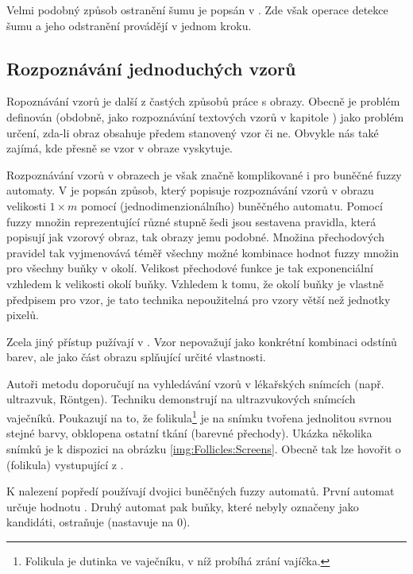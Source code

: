 \documentclass[a4paper,10pt]{article}
\begin{document}
Velmi podobný způsob ostranění šumu je popsán v \cite{SahUguSah-SalPepNoiFilFuzCelAut}. Zde však operace detekce šumu a jeho odstranění provádějí v jednom kroku.

\subsection{Rozpoznávání jednoduchých vzorů}

Ropoznávání vzorů je další z častých způsobů práce s obrazy. Obecně je problém definován (obdobně, jako rozpoznávání textových vzorů v kapitole ) jako problém určení, zda-li obraz obsahuje předem stanovený vzor či ne. Obvykle nás také zajímá, kde přesně se vzor v obraze vyskytuje.

Rozpoznávání vzorů v obrazech je však značně komplikované i pro buněčné fuzzy automaty. V \cite{MajCha-FuzCelAutModPatClas} je popsán způsob, který popisuje rozpoznávání vzorů v obrazu velikosti $1 \times m$ pomocí (jednodimenzionálního) buněčného automatu. Pomocí fuzzy množin reprezentující různé stupně šedi jsou sestavena pravidla, která popisují jak vzorový obraz, tak obrazy jemu podobné. Množina přechodových pravidel tak vyjmenovává téměř všechny možné kombinace hodnot fuzzy množin pro všechny buňky v okolí. Velikost přechodové funkce je tak exponenciální vzhledem k velikosti okolí buňky. Vzhledem k tomu, že okolí buňky je vlastně předpisem pro vzor, je tato technika nepoužitelná pro vzory větší než jednotky pixelů.

Zcela jiný přístup pužívají v \cite{WanJiaZhoDu-ImProcBasFuzCelAuMod}. Vzor nepovažují jako konkrétní kombinaci odstínů barev, ale jako část obrazu splňující určité vlastnosti.

Autoři metodu doporučují na vyhledávání vzorů v lékařských snímcích (např. ultrazvuk, Röntgen). Techniku demonstrují na ultrazvukových snímcích vaječníků. Poukazují na to, že folikula\footnote{Folikula je dutinka ve vaječníku, v níž probíhá zrání vajíčka. } je na snímku tvořena jednolitou svrnou stejné barvy, obklopena ostatní tkání (barevné přechody). Ukázka několika snímků je k dispozici na obrázku \ref{img:Follicles:Screens}. Obecně tak lze hovořit o  (folikula) vystupující z .

K nalezení popředí používají dvojici buněčných fuzzy automatů. První automat určuje hodnotu . Druhý automat pak buňky, které nebyly označeny jako kandidáti, ostraňuje (nastavuje na $0$).
\end{document}
